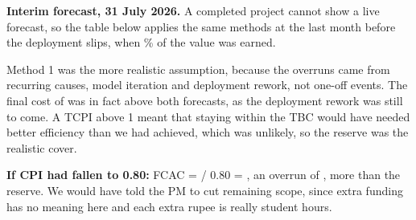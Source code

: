 \textbf{Interim forecast, 31 July 2026.} A completed project cannot show a live forecast, so the table below applies the same methods at the last month before the deployment slips, when \viPct{}\% of the value was earned.


Method 1 was the more realistic assumption, because the overruns came from recurring causes, model iteration and deployment rework, not one-off events. The final cost of \vCAC{} was in fact above both forecasts, as the deployment rework was still to come. A TCPI above 1 meant that staying within the TBC would have needed better efficiency than we had achieved, which was unlikely, so the reserve was the realistic cover.

\textbf{If CPI had fallen to 0.80:} FCAC = \vTBC{} / 0.80 = \vFCACeighty{}, an overrun of \vOverrunEighty{}, more than the \vRESERVE{} reserve. We would have told the PM to cut remaining scope, since extra funding has no meaning here and each extra rupee is really student hours.


